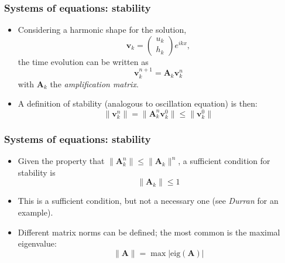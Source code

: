 \documentclass[aspectratio=43,9pt]{beamer}
\begin{document}
%
\begin{frame}
	\frametitle{Systems of equations: stability}
	\begin{itemize}
		\item Considering a harmonic shape for the solution,
			\begin{equation*}
				\bm v_k = \left(\begin{array}{c} u_k \\ h_k\end{array}\right)e^{ikx},
			\end{equation*}
			the time evolution can be written as
			\begin{equation*}
				\bm v_k^{n+1}=\bm A_k \bm v_k^n
			\end{equation*}
			with $\bm A_k$ the \emph{amplification matrix}.\vspace*{2ex}
		\item A definition of stability (analogous to oscillation equation) is then:
			\begin{equation*}
				\| {\bm v}_k^n \|  =  \| {\bm A}_k^n {\bm v}_k^0 \|  \le   \| {\bm v}_k^0 \|
			\end{equation*}
	\end{itemize}
\end{frame}
%
%
\begin{frame}
	\frametitle{Systems of equations: stability}
	\begin{itemize}
		\item Given the property that $\| {\bm A}_k^n \| \le \| {\bm A}_k \|^n$, a sufficient condition for stability is
			\begin{equation*}
				\| {\bm A}_k \| \le 1
			\end{equation*}\vspace*{2ex}
		\item This is a sufficient condition, but not a necessary one (see \emph{Durran} for an example).\vspace*{2ex}
		\item Different matrix norms can be defined; the most common is the maximal eigenvalue:
			\begin{equation*}
				\|\bm A\| = \max \left| \text{eig} (\bm A) \right|
			\end{equation*}
	\end{itemize}
\end{frame}
%
\end{document}
